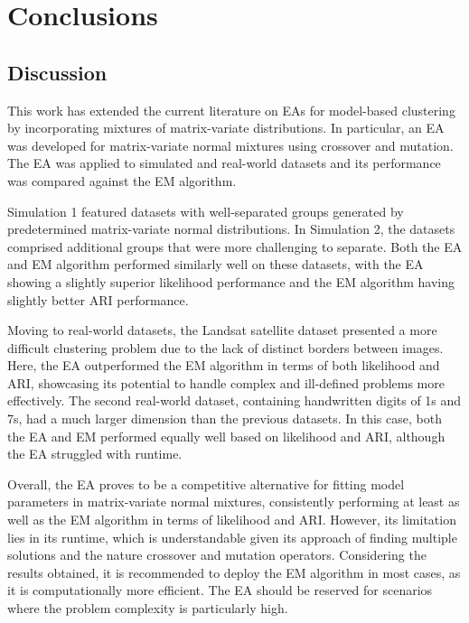 \documentclass[12pt]{report}
\begin{document}
\chapter{Conclusions}




\section{Discussion}
This work has extended the current literature on EAs for model-based clustering by incorporating mixtures of matrix-variate distributions. In particular, an EA was developed for matrix-variate normal mixtures using crossover and mutation. The EA was applied to simulated and real-world datasets and its performance was compared against the EM algorithm. 

Simulation 1 featured datasets with well-separated groups generated by predetermined matrix-variate normal distributions. In Simulation 2, the datasets comprised additional groups that were more challenging to separate. Both the EA and EM algorithm performed similarly well on these datasets, with the EA showing a slightly superior likelihood performance and the EM algorithm having slightly better ARI performance.

Moving to real-world datasets, the Landsat satellite dataset presented a more difficult clustering problem due to the lack of distinct borders between images. Here, the EA outperformed the EM algorithm in terms of both likelihood and ARI, showcasing its potential to handle complex and ill-defined problems more effectively. The second real-world dataset, containing handwritten digits of 1s and 7s, had a much larger dimension than the previous datasets. In this case, both the EA and EM performed equally well based on likelihood and ARI, although the EA struggled with runtime. 

Overall, the EA proves to be a competitive alternative for fitting model parameters in matrix-variate normal mixtures, consistently performing at least as well as the EM algorithm in terms of likelihood and ARI. However, its limitation lies in its runtime, which is understandable given its approach of finding multiple solutions and the nature crossover and mutation operators. Considering the results obtained, it is recommended to deploy the EM algorithm in most cases, as it is computationally more efficient. The EA should be reserved for scenarios where the problem complexity is particularly high.
\end{document}
